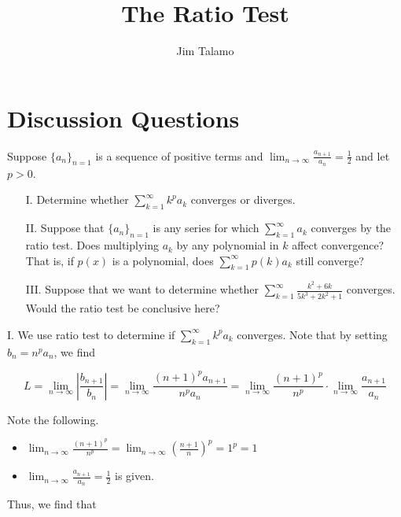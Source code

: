 \documentclass[noauthor]{ximera}
\author{Jim Talamo}
\title[]{The Ratio Test}
\begin{document}
\begin{abstract}
\end{abstract}
\maketitle

\vspace{-0.5in}

\section{Discussion Questions}

\begin{problem}
Suppose $\{a_n\}_{n=1}$ is a sequence of positive terms and $\lim_{n \to \infty} \frac{a_{n+1}}{a_n} = \frac{1}{2}$ and let $p>0$.  
\begin{itemize}
\item[I.] Determine whether $\sum_{k=1}^{\infty} k^p a_k$ converges or diverges.  
\item[II.] Suppose that $\{a_n\}_{n=1}$ is any series for which $\sum_{k=1}^{\infty} a_k$ converges by the ratio test.  Does multiplying $a_k$ by any polynomial in $k$ affect convergence?  That is, if $p(x)$ is a polynomial, does $\sum_{k=1}^{\infty} p(k)a_k$ still converge?
\item[III.] Suppose that we want to determine whether $\sum_{k=1}^\infty \frac{k^2+6k}{5k^3 + 2k^2 + 1}$ converges.  Would the ratio test be conclusive here?
\end{itemize}

\begin{freeResponse}
I. We use ratio test to determine if $\sum_{k=1}^{\infty} k^p a_k$ converges.  Note that by setting $b_n = n^p a_n$, we find

\[
L = \lim_{n \to \infty} \left|\frac{b_{n+1}}{b_n}\right| = \lim_{n \to \infty} \frac{(n+1)^p a_{n+1}}{n^p a_n}= \lim_{n \to \infty} \frac{(n+1)^p}{n^p} \cdot \lim_{n \to \infty} \frac{a_{n+1}}{a_n}
\]

Note the following.

\begin{itemize}
\item $\lim_{n \to \infty} \frac{(n+1)^p}{n^p} = \lim_{n \to \infty} \left(\frac{n+1}{n}\right)^p  = 1^p =1$
\item  $\lim_{n \to \infty} \frac{a_{n+1}}{a_n} = \frac{1}{2}$ is given.
\end{itemize}

Thus, we find that


\end{freeResponse}
\end{problem}
\end{document}
